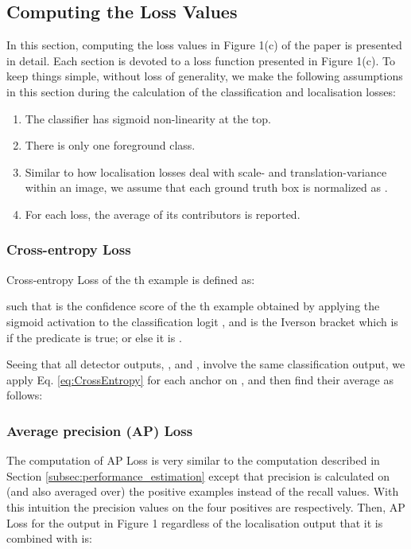 \documentclass{article}
\begin{document}
\subsection{Computing the Loss Values}
\label{subsec:loss_est}
In this section, computing the loss values in Figure 1(c) of the paper is presented in detail. Each section is devoted to a loss function presented in  Figure 1(c). To keep things simple, without loss of generality, we make the following assumptions in this section during the calculation of the classification and localisation losses:

\begin{enumerate}
    \item The classifier has sigmoid non-linearity at the top.
    \item There is only one foreground class.
    \item Similar to how localisation losses deal with scale- and translation-variance within an image, we assume that each ground truth box is normalized as .
    \item For each loss, the average of its contributors is reported.
\end{enumerate}

\subsubsection{Cross-entropy Loss}
Cross-entropy Loss of the th example is defined as:

such that  is the confidence score of the th example obtained by applying the sigmoid activation to the classification logit , and  is the Iverson bracket which is  if the predicate  is true; or else it is .

Seeing that all detector outputs, ,  and , involve the same classification output, we apply Eq. \eqref{eq:CrossEntropy} for each anchor on , and then find their average as follows:


\subsubsection{Average precision (AP) Loss}
The computation of AP Loss is very similar to the  computation described in Section \ref{subsec:performance_estimation} except that precision is calculated on (and also averaged over) the positive examples instead of the recall values. With this intuition the precision values on the four positives are  respectively. Then, AP Loss for the output  in Figure 1 regardless of the localisation output that it is combined with is:
\end{document}
